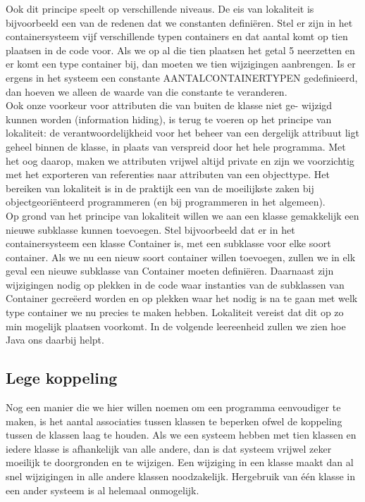\documentclass{article}
\begin{document}
	Ook dit principe speelt op verschillende niveaus. De eis van lokaliteit
	is bijvoorbeeld een van de redenen dat we constanten definiëren. Stel er
	zijn in het containersysteem vijf verschillende typen containers en dat
	aantal komt op tien plaatsen in de code voor. Als we op al die tien
	plaatsen het getal 5 neerzetten en er komt een type container bij, dan
	moeten we tien wijzigingen aanbrengen. Is er ergens in het systeem een
	constante AANTALCONTAINERTYPEN gedefinieerd, dan hoeven we alleen
	de waarde van die constante te veranderen. \\
	
	Ook onze voorkeur voor attributen die van buiten de klasse niet ge-
	wijzigd kunnen worden (information hiding), is terug te voeren op het
	principe van lokaliteit: de verantwoordelijkheid voor het beheer van een
	dergelijk attribuut ligt geheel binnen de klasse, in plaats van verspreid
	door het hele programma. Met het oog daarop, maken we attributen
	vrijwel altijd private en zijn we voorzichtig met het exporteren van
	referenties naar attributen van een objecttype.
	Het bereiken van lokaliteit is in de praktijk een van de moeilijkste zaken
	bij objectgeoriënteerd programmeren (en bij programmeren in het algemeen). \\
	
	Op grond van het principe van lokaliteit willen we aan een klasse
	gemakkelijk een nieuwe subklasse kunnen toevoegen. Stel bijvoorbeeld
	dat er in het containersysteem een klasse Container is, met een subklasse
	voor elke soort container. Als we nu een nieuw soort container willen
	toevoegen, zullen we in elk geval een nieuwe subklasse van Container
	moeten definiëren. Daarnaast zijn wijzigingen nodig op plekken in de
	code waar instanties van de subklassen van Container gecreëerd worden
	en op plekken waar het nodig is na te gaan met welk type container we
	nu precies te maken hebben. Lokaliteit vereist dat dit op zo min mogelijk
	plaatsen voorkomt. In de volgende leereenheid zullen we zien hoe Java
	ons daarbij helpt. \\
	
	\subsection{Lege koppeling}
		
	Nog een manier die we hier willen noemen om een programma
	eenvoudiger te maken, is het aantal associaties tussen klassen te
	beperken ofwel de koppeling tussen de klassen laag te houden. Als we een
	systeem hebben met tien klassen en iedere klasse is afhankelijk van alle
	andere, dan is dat systeem vrijwel zeker moeilijk te doorgronden en te
	wijzigen. Een wijziging in een klasse maakt dan al snel wijzigingen in
	alle andere klassen noodzakelijk. Hergebruik van één klasse in een ander
	systeem is al helemaal onmogelijk.
	
\end{document}
